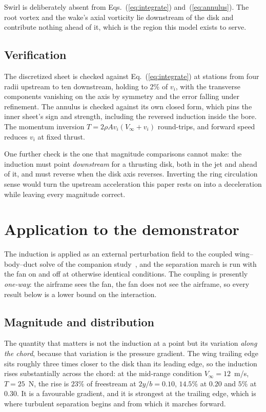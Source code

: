\documentclass[submit]{aiaa-tc}%
\newcommand{\eqnref}[1]{(\ref{#1})}
\begin{document}
Swirl is deliberately absent from Eqs.~\eqnref{eq:integrate}
and~\eqnref{eq:annulus}. The root vortex and the wake's axial vorticity
lie downstream of the disk and contribute nothing ahead of it, which is
the region this model exists to serve.

\subsection{Verification}

The discretized sheet is checked against Eq.~\eqnref{eq:integrate} at stations
from four radii upstream to ten downstream, holding to 2\% of $v_i$, with
the transverse components vanishing on the axis by symmetry and the error
falling under refinement. The annulus is checked against its own closed
form, which pins the inner sheet's sign and strength, including the
reversed induction inside the bore. The momentum inversion
$T = 2\rho A v_i (V_\infty + v_i)$ round-trips, and forward speed reduces
$v_i$ at fixed thrust.

One further check is the one that magnitude comparisons cannot make: the
induction must point \emph{downstream} for a thrusting disk, both in the
jet and ahead of it, and must reverse when the disk axis reverses.
Inverting the ring circulation sense would turn the upstream acceleration
this paper rests on into a deceleration while leaving every magnitude
correct.

\section{Application to the demonstrator}
\label{sec:application}

The induction is applied as an external perturbation field to the coupled
wing--body--duct solve of the companion study~\cite{aeolion2026}, and the
separation march is run with the fan on and off at otherwise identical
conditions. The
coupling is presently \emph{one-way}: the airframe sees the fan, the fan
does not see the airframe, so every result below is a lower bound on the
interaction.

\subsection{Magnitude and distribution}

The quantity that matters is not the induction at a point but its
variation \emph{along the chord}, because that variation is the pressure
gradient. The wing trailing edge sits roughly three times closer to the
disk than its leading edge, so the induction rises substantially across
the chord: at the mid-range condition $V_\infty = 12$~m/s, $T = 25$~N, the
rise is $23\%$ of freestream at $2y/b = 0.10$, $14.5\%$ at $0.20$ and
$5\%$ at $0.30$. It is a favourable gradient, and it is strongest at the
trailing edge, which is where turbulent separation begins and from which
it marches forward.
\end{document}

